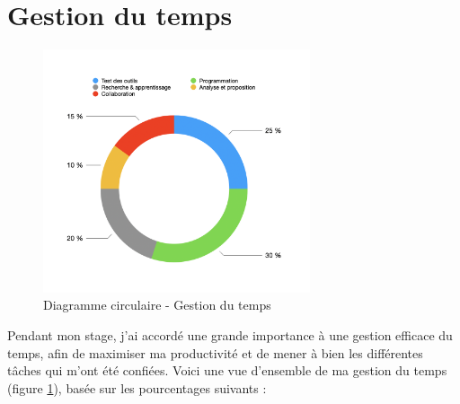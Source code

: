 \vspace*{1cm}
\section{Gestion du temps}

\begin{figure}[h] 
    \centering
    \includegraphics[width=0.7\textwidth]{Includes/Images/gestionTemps.png}
    \caption{Diagramme circulaire - Gestion du temps}
    \label{fig:Diagramme circulaire - Gestion du temps}
\end{figure}  

Pendant mon stage, j'ai accordé une grande importance à une gestion efficace du temps, afin de maximiser ma productivité et de mener à bien les différentes tâches qui m'ont été confiées. Voici une vue d'ensemble de ma gestion du temps (figure \ref{fig:Diagramme circulaire - Gestion du temps}), basée sur les pourcentages suivants :


